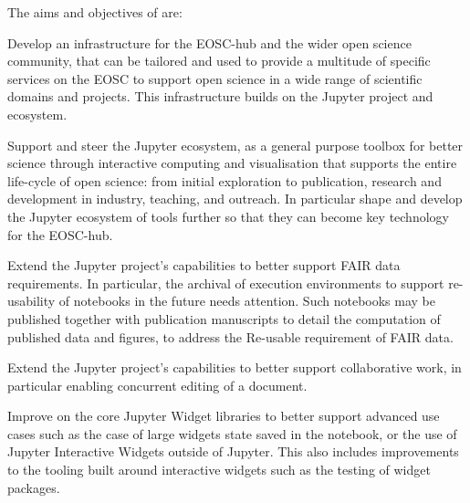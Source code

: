 

\noindent The aims and objectives of \TheProject are:
\begin{compactenum}

\item \label{aim:eosc}%
  Develop an infrastructure for the EOSC-hub and the wider open
  science community, that can be tailored and used to provide a
  multitude of specific services on the EOSC to support open science
  in a wide range of scientific domains and projects. This infrastructure
  builds on the Jupyter project and ecosystem.

\item \label{aim:jupyter}%
  Support and steer the Jupyter ecosystem, as a general purpose
  toolbox for better science through interactive computing and
  visualisation that supports the entire life-cycle of open science:
  from initial exploration to publication, research and development in
  industry, teaching, and outreach. In particular shape and develop
  the Jupyter ecosystem of tools further so that they can become key
  technology for the EOSC-hub.

\item \label{aim:jupyter-reusability}%
  Extend the Jupyter project's capabilities to better support FAIR
  data requirements. In particular, the archival of execution
  environments to support re-usability of notebooks in the future
  needs attention. Such notebooks may be published together with
  publication manuscripts to detail the computation of published data
  and figures, to address the Re-usable requirement of FAIR data.

\item \label{aim:jupyter-collaboration}%
  Extend the Jupyter project's capabilities to better support
  collaborative work, in particular enabling concurrent editing of a
  document.

\item \label{aim:jupyter-widgets}%
  Improve on the core Jupyter Widget libraries to better support advanced
  use cases such as the case of large widgets state saved in the notebook, or
  the use of Jupyter Interactive Widgets outside of Jupyter. This also includes
  improvements to the tooling built around interactive widgets such as the
  testing of widget packages.


\end{compactenum}
